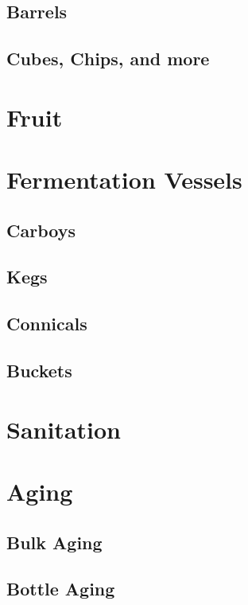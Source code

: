 \documentclass{article}
\begin{document}
{ \subsection{Barrels}
 \subsection{Cubes, Chips, and more}

\section{Fruit}

\section{Fermentation Vessels}
 \subsection{Carboys}
 \subsection{Kegs}
 \subsection{Connicals}
 \subsection{Buckets}

\section{Sanitation}

\section{Aging}
 \subsection{Bulk Aging}
 \subsection{Bottle Aging}



}
\end{document}
